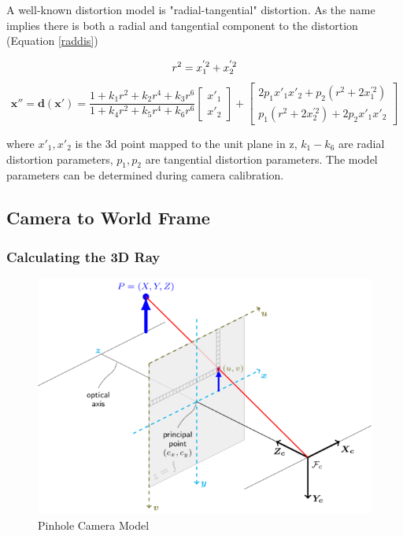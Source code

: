 \documentclass[11pt,twoside]{report}
\begin{document}
A well-known distortion model is "radial-tangential" distortion. As the name implies there is both a radial and tangential component to the distortion (Equation \ref{raddis}) 

\begin{equation}
r^{2} = x_{1}^{'2} + x_{2}^{'2} \\
\end{equation}
\begin{equation}
\mathbf{x''} = \mathbf{d(x')} = \frac{1 + k_{1}r^{2} + k_{2}r^{4}+k_{3}r^{6}}{1+ k_{4}r^{2} + k_{5}r^{4}+k_{6}r^{6}}
\begin{bmatrix}
x'_{1} \\[0.3em]
x'_{2}
\end{bmatrix}
+ 
\begin{bmatrix}
2p_{1}x'_{1}x'_{2} + p_{2}(r^{2} + 2x_{1}^{'2}) \\[0.3em]
p_{1}(r^{2} + 2x_{2}^{'2}) + 2p_{2}x'_{1}x'_{2}
\end{bmatrix}
\label{raddis}
\end{equation}



where $x'_{1},x'_{2}$ is the 3d point mapped to the unit plane in z, $k_{1}-k_{6}$ are radial distortion parameters, $p_{1},p_{2}$ are tangential distortion parameters. The model parameters can be determined during camera calibration.


\subsection{Camera to World Frame} \label{cam2world}

\subsubsection{Calculating the 3D Ray}

\noindent \begin{figure}[h!]
	\includegraphics[width = 1.0\hsize]{figures/pinhole_camera_model.png}
	\caption{Pinhole Camera Model}
	\label{pinhole_model}
\end{figure}
\end{document}
